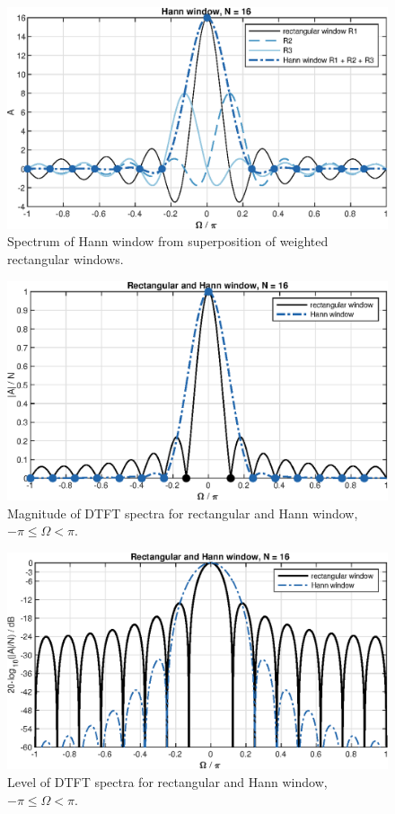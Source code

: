 \documentclass[11pt,a4paper,DIV=12]{scrartcl}
\begin{document}
\begin{figure}
		\centering
		\includegraphics[]{graphics/HanningausRectWindow}
		\caption{Spectrum of Hann window from superposition of weighted rectangular windows.}
		\label{HanningausRectWindow}
\end{figure}
\begin{figure}
		\centering
		\includegraphics[]{graphics/DTFTHanningWin_lin}
		\caption{Magnitude of DTFT spectra for rectangular and Hann window, $-\pi\leq\Omega<\pi$.}
		\label{DTFTHanningWin_lin}
\end{figure}
\begin{figure}
		\centering
		\includegraphics[]{graphics/DTFTHanningWin_log}
		\caption{Level of DTFT spectra for rectangular and Hann window, $-\pi\leq\Omega<\pi$.}
		\label{DTFTHanningWin_log}
\end{figure}
\end{document}
